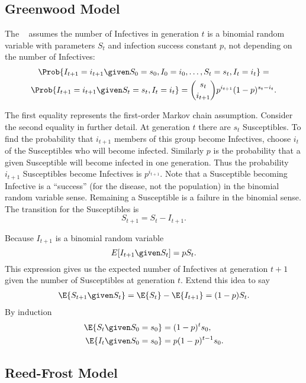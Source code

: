 \documentclass[12pt]{article}
\begin{document}
\subsection*{Greenwood Model}

The ~%
assumes the number of Infectives in generation \( t \) is a binomial
random variable with parameters \( S_t \) and infection success constant
\( p \), not depending on the number of Infectives:
\begin{multline*}
    \Prob{I_{t+1}=i_{t+1} \given S_0=s_0, I_0=i_0, \ldots,S_t=s_t, I_t=i_t}
    = \\
    \Prob{I_{t+1}=i_{t+1} \given S_t=s_t, I_t=i_t} = \binom{s_t}{i_{t+1}}p^
    {i_{t+1}}(1-p)^{s_t-i_t}.
\end{multline*}

The first equality represents the first-order Markov chain assumption.
Consider the second equality in further detail.  At generation \( t \)
there are \( s_t \) Susceptibles.  To find the probability that \( i_{t+1}
\) members of this group become Infectives, choose \( i_{t} \) of the
Susceptibles who will become infected.  Similarly \( p \) is the
probability that a given Susceptible will become infected in one
generation.  Thus the probability \( i_{t+1} \) Susceptibles become
Infectives is \( p^{i_{t+1}} \).  Note that a Susceptible becoming
Infective is a ``success'' (for the disease, not the population) in the
binomial random variable sense.  Remaining a Susceptible is a failure in
the binomial sense.  The transition for the Susceptibles is
\[
    S_{t+1} = S_t - I_{t+1}.
\]

Because \( I_{t+1} \) is a binomial random variable
\[
    E[I_{t+1} \given S_t]= p S_t.
\] This expression gives us the expected number of Infectives at
generation \( t+1 \) given the number of Susceptibles at generation \( t
\).  Extend this idea to say
\begin{align*}
    \E{S_{t+1} \given S_t } = \E{S_t} - \E{I_{t+1}} = (1-p) S_t.
\end{align*}
By induction
\begin{align*}
    \E{S_t \given S_0= s_0} &= (1-p)^t s_0, \\
    \E{I_t \given S_0= s_0} &= p(1-p)^{t-1} s_{0}.
\end{align*}

\subsection*{Reed-Frost Model}
\end{document}
